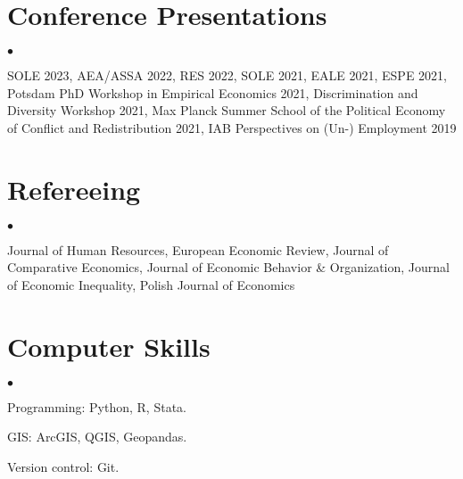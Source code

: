 \documentclass[margin,line]{res}
\newenvironment{list2}{
  \begin{list}{$\bullet$}{%
      \setlength{\itemsep}{0in}
      \setlength{\parsep}{0in} \setlength{\parskip}{0in}
      \setlength{\topsep}{0in} \setlength{\partopsep}{0in} 
      \setlength{\leftmargin}{0.2in}}}{\end{list}}
\begin{document}
\begin{resume}
\section{\sc Conference Presentations} 
\begin{list2}
	\item SOLE 2023, AEA/ASSA 2022, RES 2022, SOLE 2021, EALE 2021, ESPE 2021, Potsdam PhD Workshop in Empirical Economics 2021, Discrimination and Diversity Workshop 2021, Max Planck Summer School of the Political Economy of Conflict and Redistribution 2021, IAB Perspectives on (Un-) Employment 2019 
\end{list2}
\vspace*{.05in} 
\section{\sc Refereeing} 
\begin{list2}
	\item Journal of Human Resources, European Economic Review, Journal of Comparative Economics, Journal of Economic Behavior \& Organization, Journal of Economic Inequality, Polish Journal of Economics  
\end{list2}
\vspace*{.05in} 
\section{\sc Computer Skills} 
\begin{list2}
\item Programming: Python, R, Stata.
\item GIS:  ArcGIS, QGIS, Geopandas.
\item Version control: Git.\\ 
\end{list2}



\end{resume}
\end{document}
